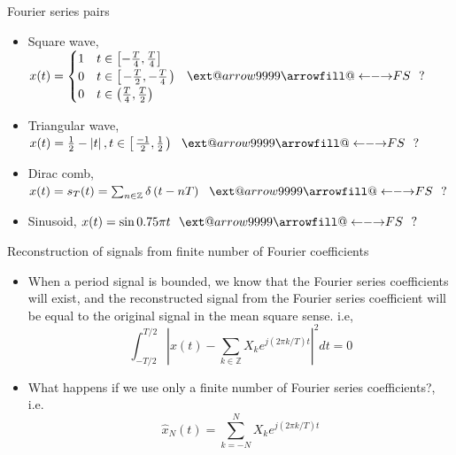 \documentclass{beamer}
\makeatletter
\newcommand\xleftrightarrow[2][]{%
  \ext@arrow 9999{\longleftrightarrowfill@}{#1}{#2}}
\newcommand\longleftrightarrowfill@{%
  \arrowfill@\leftarrow\relbar\rightarrow}
\makeatother
\begin{document}
\begin{frame}{Fourier series pairs}

\begin{itemize}
\item Square wave, $x(t) = \begin{cases}
1 & t \in \left[-\frac{T}{4}, \frac{T}{4}\right] \\
0 & t \in \left[\left.-\frac{T}{2}, -\frac{T}{4}\right.\right) \\
0 & t \in \left(\frac{T}{4}, \frac{T}{2}\right)
\end{cases} \,\,\,\, \xleftrightarrow{FS} \,\,\,\, ?$
\item  Triangular wave, $x(t) = \frac{1}{2} - \left|t\right|, t \in \left[\left.\frac{-1}{2}, \frac{1}{2}\right.\right)  \,\,\,\, \xleftrightarrow{FS} \,\,\,\, ?$
\item  Dirac comb, $x(t) = s_{T}(t) = \sum_{n\in\mathbb{Z}} \delta\left(t - nT\right)  \,\,\,\, \xleftrightarrow{FS} \,\,\,\, ?$
\item  Sinusoid, $x(t) = \sin 0.75\pi t \,\,\,\, \xleftrightarrow{FS} \,\,\,\, ?$
\end{itemize}

\end{frame}

\begin{frame}{Reconstruction of signals from finite number of Fourier coefficients}

\begin{itemize}
\item When a period signal is bounded, we know that the Fourier series coefficients will exist, and the reconstructed signal from the Fourier series coefficient will be equal to the original signal in the mean square sense. i.e,
\[ \int_{-T/2}^{T/2} \left|x(t) - \sum_{k\in\mathbb{Z}}X_ke^{j(2\pi k/T)t}\right|^2dt = 0 \]

\item What happens if we use only a finite number of Fourier series coefficients?, i.e.
\[ \hat{x}_N(t) = \sum_{k=-N}^{N}X_ke^{j(2\pi k/T)t} \]
\end{itemize}

\end{frame}
\end{document}
